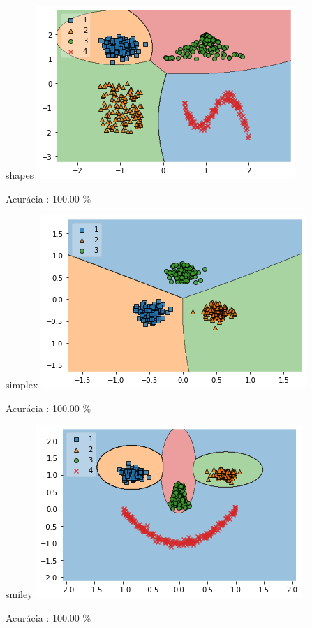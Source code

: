 \documentclass[darkblue]{beamer}
\begin{document}
    \begin{frame}{shapes}
        \includegraphics[width=\textwidth]{output_55_0.png}
        \centerline{Acurácia  : 100.00 \%}
    \end{frame}
    
    \begin{frame}{simplex}
        \includegraphics[width=\textwidth]{output_59_0.png}
        \centerline{Acurácia  : 100.00 \%}
    \end{frame}
    
    \begin{frame}{smiley}
        \includegraphics[width=\textwidth]{output_63_0.png}
        \centerline{Acurácia  : 100.00 \%}
    \end{frame}
    
\end{document}

